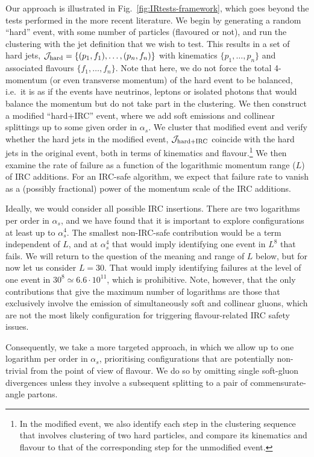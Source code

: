 \documentclass[nofootinbib,twocolumn,preprintnumbers,superscriptaddress,aps]{revtex4-2}
\newcommand{\as}{\alpha_s}
\newcommand{\Jhard}{\mathcal{J}_{\rm hard}}
\newcommand{\JhardIRC}{\mathcal{J}_{\rm hard+IRC}}
\begin{document}
Our approach is illustrated in Fig.~\ref{fig:IRtests-framework}, which goes beyond
the tests performed in the more recent literature.
%
We begin by generating a random ``hard'' event, with some number of
particles (flavoured or not), and run the clustering with the jet
definition that we wish to test.
%
This results in a set of hard jets,
$\Jhard = \{ (p_1, f_1), \dots, (p_n, f_n)\}$ with kinematics
$\{p_1, \dots, p_n\}$ and associated flavours $\{f_1, \dots,
f_n\}$.
%
Note that here, we do not force the total 4-momentum (or even
transverse momentum) of the hard
event to be balanced, i.e.\ it is as if the events have neutrinos,
leptons or isolated photons that would balance the momentum but do not take part in the
clustering. 
%
We then construct a modified ``hard+IRC'' event, where we add soft
emissions and collinear splittings up to some given order in $\as$.
%
We cluster that modified event and verify whether the hard jets in the
modified event, $\JhardIRC$ coincide with the hard jets in the
original event, both in terms of kinematics and flavour.\footnote{In
  the modified event, we also identify each step in the clustering
  sequence that involves clustering of two hard particles, and compare
  its kinematics and flavour to that of the corresponding step for the
  unmodified event.}
%
We then examine the rate of failure as a function of the logarithmic
momentum range ($L$) of IRC additions.
%
For an IRC-safe algorithm, we expect that failure rate to vanish as a
(possibly fractional) power of the momentum scale of the IRC additions.


Ideally, we would consider all possible IRC insertions.
%
There are two logarithms per order in $\as$, and we have found that it
is important to explore configurations at least up to $\as^4$.
%
The smallest non-IRC-safe contribution would be a term independent of
$L$, and at $\as^4$ that would imply identifying one event in $L^8$
that fails.
%
We will return to the question of the meaning and range of $L$ below,
but for now let us consider $L=30$.
%
That would imply identifying failures at the level of one event in
$30^8 \simeq 6.6\cdot 10^{11}$, which is prohibitive.
%
Note, however, that the only contributions that give the maximum
number of logarithms are those that exclusively involve the emission
of simultaneously soft and collinear gluons, which are not the most
likely configuration for triggering flavour-related IRC safety issues.

Consequently, we take a more targeted approach, in which we allow up to one
logarithm per order in $\as$, prioritising configurations that are
potentially non-trivial from the point of view of flavour.
%
We do so by omitting single soft-gluon divergences unless they involve
a subsequent splitting to a pair of commensurate-angle partons.
\end{document}
